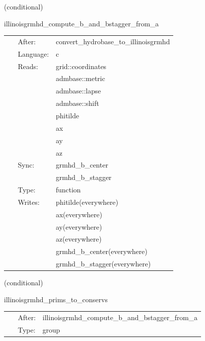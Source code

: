 \documentclass{article}
\begin{document}
\vspace{5mm}

   (conditional) 

\hspace{5mm} illinoisgrmhd\_compute\_b\_and\_bstagger\_from\_a 

\hspace{5mm}{\it compute b and b\_stagger from a } 


\hspace{5mm}

 \begin{tabular*}{160mm}{cll} 
~ & After:  & convert\_hydrobase\_to\_illinoisgrmhd \\ 
~ & Language:  & c \\ 
~ & Reads:  & grid::coordinates \\ 
~& ~ &admbase::metric\\ 
~& ~ &admbase::lapse\\ 
~& ~ &admbase::shift\\ 
~& ~ &phitilde\\ 
~& ~ &ax\\ 
~& ~ &ay\\ 
~& ~ &az\\ 
~ & Sync:  & grmhd\_b\_center \\ 
~& ~ &grmhd\_b\_stagger\\ 
~ & Type:  & function \\ 
~ & Writes:  & phitilde(everywhere) \\ 
~& ~ &ax(everywhere)\\ 
~& ~ &ay(everywhere)\\ 
~& ~ &az(everywhere)\\ 
~& ~ &grmhd\_b\_center(everywhere)\\ 
~& ~ &grmhd\_b\_stagger(everywhere)\\ 
\end{tabular*} 


\vspace{5mm}

   (conditional) 

\hspace{5mm} illinoisgrmhd\_prims\_to\_conservs 

\hspace{5mm}{\it compute conservative variables from primitives } 


\hspace{5mm}

 \begin{tabular*}{160mm}{cll} 
~ & After:  & illinoisgrmhd\_compute\_b\_and\_bstagger\_from\_a \\ 
~ & Type:  & group \\ 
\end{tabular*} 
\end{document}
